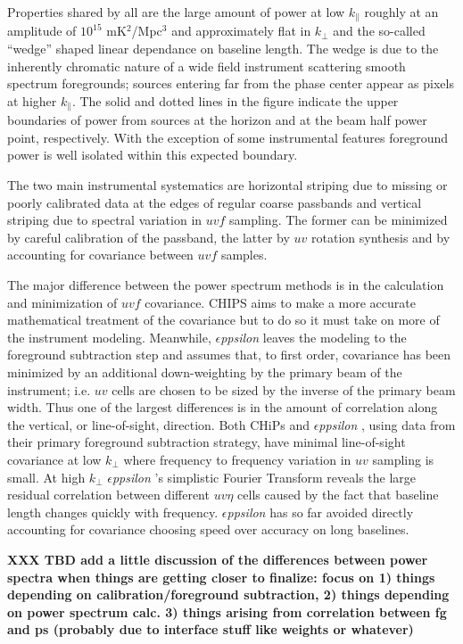 \documentclass[preprint]{aastex}
\def\eppsilon{{\it $\epsilon$ppsilon }}
\begin{document}
Properties shared by all are the large amount of power at low $k_{\parallel}$ roughly at an amplitude of $10^15$ mK$^2$/Mpc$^3$ and approximately flat in $k_{\perp}$ and the so-called ``wedge'' shaped linear dependance on baseline length.  The wedge is due to the inherently chromatic nature of a wide field instrument scattering smooth spectrum foregrounds; sources entering far from the phase center appear as pixels at higher $k_\parallel$. The solid and dotted lines in the figure indicate the upper boundaries of power from sources at the horizon and at the beam half power point, respectively.  With the exception of some instrumental features foreground power is well isolated within this expected boundary.

The two main instrumental systematics are horizontal striping due to missing or poorly calibrated data at the edges of regular coarse passbands and vertical striping due to spectral variation in $uvf$ sampling. The former can be minimized by careful calibration of the passband, the latter by $uv$ rotation synthesis and by accounting for covariance between $uvf$ samples. 


The major difference between the power spectrum methods is in the calculation and minimization of $uvf$ covariance.   CHIPS aims to make a more accurate mathematical treatment of the covariance but to do so it must take on more of the instrument modeling. Meanwhile, \eppsilon leaves the modeling to the foreground subtraction step and assumes that, to first order, covariance has been minimized by an  additional down-weighting by the primary beam of the instrument;  i.e. $uv$ cells are chosen to be sized by the inverse of the primary beam width.  Thus one of the largest differences is in the amount of correlation along the vertical, or line-of-sight, direction.  Both CHiPs and \eppsilon, using data from their primary foreground subtraction strategy, have minimal line-of-sight covariance at low $k_\perp$ where frequency to frequency variation in $uv$ sampling is small. At high $k_\perp$ \eppsilon's simplistic Fourier Transform reveals the large residual correlation between different $uv\eta$ cells caused by the fact that baseline length changes quickly with frequency.  \eppsilon has so far avoided directly accounting for covariance choosing speed over accuracy on long baselines.

{\bf XXX TBD add a little discussion of the differences between power spectra when things are getting closer to finalize: focus on 1) things depending on calibration/foreground subtraction, 2) things depending on power spectrum calc.  3) things arising from correlation between fg and ps (probably due to interface stuff like weights or whatever)}
\end{document}
